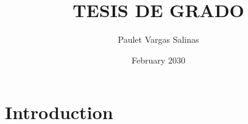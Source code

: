 \documentclass{article}
\title{TESIS DE GRADO}
\author{Paulet Vargas Salinas}
\date{February 2030}
\begin{document}
\maketitle

\section{Introduction}
\end{document}
